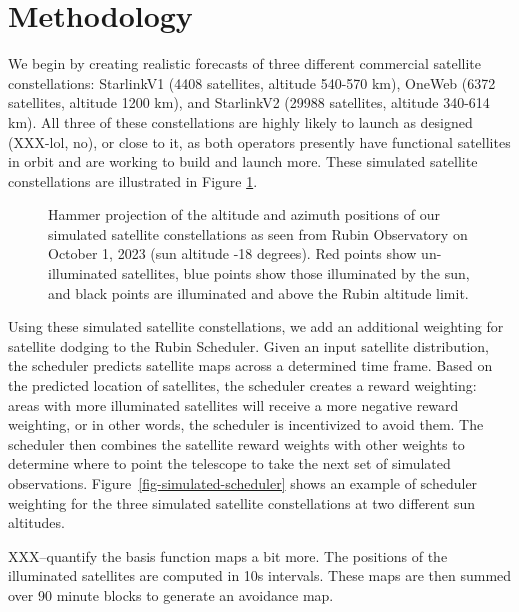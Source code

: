\documentclass[linenumbers]{aastex631}
\begin{document}

\section{Methodology}
We begin by creating realistic forecasts of three different commercial satellite constellations: StarlinkV1 (4408 satellites, altitude 540-570 km), OneWeb (6372 satellites, altitude 1200 km), and StarlinkV2 (29988 satellites, altitude 340-614 km). All three of these constellations are highly likely to launch as designed (XXX-lol, no), or close to it, as both operators presently have functional satellites in orbit and are working to build and launch more. These simulated satellite
constellations are illustrated in Figure \ref{fig-simulated-constellations}.

\begin{figure}[ht!]
\caption{Hammer projection of the altitude and azimuth positions of our simulated satellite constellations as seen from Rubin Observatory on October 1, 2023 (sun altitude -18 degrees). Red points show un-illuminated satellites, blue points show those illuminated by the sun, and black points are illuminated and above the Rubin altitude limit. \label{fig-simulated-constellations}}
\end{figure}

Using these simulated satellite constellations, we add an additional weighting for satellite
dodging to the Rubin Scheduler. Given an input satellite distribution, the scheduler predicts
satellite maps across a determined time frame. Based on the predicted location of satellites, the
scheduler creates a reward weighting: areas with more illuminated satellites will receive a more
negative reward weighting, or in other words, the scheduler is incentivized to avoid them. The
scheduler then combines the satellite reward weights with other weights to determine where to
point the telescope to take the next set of simulated observations. Figure~\ref{fig-simulated-scheduler} shows an example of
scheduler weighting for the three simulated satellite constellations at two different sun altitudes.

XXX--quantify the basis function maps a bit more. The positions of the illuminated satellites are computed in 10s intervals. These maps are then summed over 90 minute blocks to generate an avoidance map. 
\end{document}
